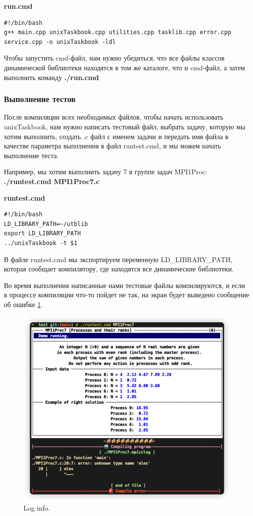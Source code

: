 \centerline{\textbf{run.cmd}}

\lstset{language=bash}
\begin{lstlisting}
#!/bin/bash
g++ main.cpp unixTaskbook.cpp utilities.cpp tasklib.cpp error.cpp service.cpp -o unixTaskbook -ldl
\end{lstlisting}

Чтобы запустить cmd-файл, нам нужно убедиться, что все файлы классов динамической 
библиотеки находятся в том же каталоге, что и cmd-файл, а затем выполнить команду \textbf{./run.cmd}

\subsubsection{Выполнение тестов}

После компиляции всех необходимых файлов, чтобы начать использовать unixTaskbook, нам 
нужно написать тестовый файл, выбрать задачу, которую мы хотим выполнить, создать .c файл 
с именем задачи и передать имя файла в качестве параметра выполнения в файл runtest.cmd, и 
мы можем начать выполнение теста.

Например, мы хотим выполнить задачу 7 в группе задач MPI1Proc: 
\\ \textbf{./runtest.cmd MPI1Proc7.c}

\centerline{\textbf{runtest.cmd}}

\lstset{language=bash}
\begin{lstlisting}
#!/bin/bash
LD_LIBRARY_PATH=~/utblib
export LD_LIBRARY_PATH
../unixTaskbook -t $1
\end{lstlisting}

В файле runtest.cmd мы экспортируем переменную LD\_LIBRARY\_PATH, 
которая сообщает компилятору, где находятся все динамические библиотеки.

Во время выполнения написанные нами тестовые файлы компилируются, и если в процессе компиляции что-то пойдет не так, на экран будет выведено сообщение об ошибке \ref{error}.
\begin{figure}[htbp]%
    \centering
    \includegraphics[width=0.8\linewidth]{images/error.png}%
    \caption{Log info.}%
    \label{error}%
\end{figure}

